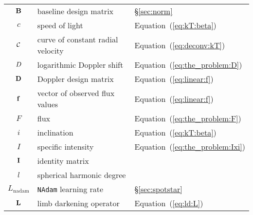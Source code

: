 \documentclass[modern]{aastex631}
\begin{document}
\begin{center}
\begin{longtable}{cll}
        ${\mathbf{B}}$                                          & baseline design matrix                                       & \S\ref{sec:norm}                 \\
        $c$                                                 & speed of light                                               & Equation~(\ref{eq:kT:beta})                \\
        $\mathcal{C}$                                            & curve of constant radial velocity                            & Equation~(\ref{eq:deconv:kT})              \\
        $D$                                                & logarithmic Doppler shift                                    & Equation~(\ref{eq:the_problem:D})          \\
        ${\mathbf{D}}$                                          & Doppler design matrix                                        & Equation~(\ref{eq:linear:f})               \\
        ${\mathbf{f}}$                                          & vector of observed flux values                               & Equation~(\ref{eq:linear:f})               \\
        $F$                                                 & flux                                                         & Equation~(\ref{eq:the_problem:F})          \\
        $i$                                                 & inclination                                                  & Equation~(\ref{eq:kT:beta})                \\
        $I$                                                 & specific intensity                                           & Equation~(\ref{eq:the_problem:Ixi})        \\
        ${\mathbf{I}}$                                          & identity matrix                                              &                                            \\
        $l$                                                 & spherical harmonic degree                                    &                                            \\
        $L_\mathrm{nadam}$                                  & \texttt{NAdam} learning rate                                 & \S\ref{sec:spotstar}                       \\
        ${\mathbf{L}}$                                          & limb darkening operator                                      & Equation~(\ref{eq:ld:L})                   \\

\end{longtable}
\end{center}
\end{document}
